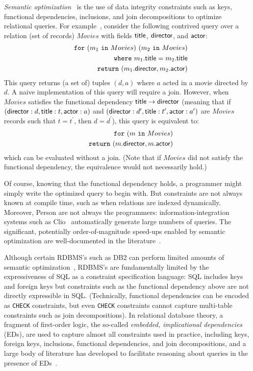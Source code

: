 \documentclass[preprint]{sigplanconf}
\newcommand{\FOR}{{\tt for} \ }
\newcommand{\WHERE}{{\tt where} \ }
\newcommand{\IN}{ \ {\tt in} \ }
\newcommand{\RETURN}{{\tt return} \ }
\begin{document}
{\it Semantic optimization}~\cite{foundations,Deutsch:2006:QRC:1121995.1122010,Popa99anequational} is the 
use of data integrity constraints such as keys, functional dependencies, inclusions, and join decompositions to optimize relational queries. For example~\cite{foundations}, consider the following contrived query over a relation (set of records) $Movies$ 
with fields ${\sf title}$, ${\sf director}$, and ${\sf actor}$:
\begin{eqnarray*}
& & \FOR (m_1 \IN Movies) \ (m_2 \IN Movies) \\
 & & \WHERE m_1.{\sf title} = m_2.{\sf title} \\
 & & \RETURN (m_1.{\sf director}, m_2.{\sf actor})
\end{eqnarray*}        
This query returns (a set of) tuples $(d,a)$ where $a$ acted in a movie directed by $d
$.  A naive implementation of this query will require a join.  However, when $Movies$ 
satisfies the functional dependency ${\sf title} \to {\sf director}$ (meaning that 
if $({\sf director}: d, {\sf title}: t, {\sf actor}: a)$ and $({\sf director}: d^\prime, {\sf title}: t^\prime, {\sf actor}: a^\prime)$ are $Movies$ records such that $t = t^\prime$, then $d = d^\prime$), this query is equivalent to:
\begin{eqnarray*}
& & \FOR (m \IN Movies) \\
 & & \RETURN (m.{\sf director}, m.{\sf actor})
 \end{eqnarray*}
which can be evaluated without a join.  (Note that if $Movies$ did not satisfy the functional dependency, the equivalence would not necessarily hold.)  

Of course, knowing that the functional dependency holds, a programmer might simply write the optimized query to begin with.  But constraints are not always known at compile time, such as when relations are indexed dynamically.  Moreover, Person are not always the programmers: information-integration systems such as Clio~\cite{haas:clio} automatically generate large numbers of queries.  The significant, potentially order-of-magnitude speed-ups enabled by semantic optimization are well-documented in the literature~\cite{Cheng:1999:ITS:645925.671357}.  

Although certain RDBMS's such as DB2 can perform limited amounts of semantic optimization~\cite{Cheng:1999:ITS:645925.671357}, RDBMS's are fundamentally limited by the expressiveness of SQL as a constraint specification language: SQL includes keys and foreign keys but constraints such as the functional dependency above are not directly expressible in SQL.  (Technically, functional dependencies can be encoded as {\tt CHECK} constraints, but even {\tt CHECK} constraints cannot capture multi-table constraints such as join decompositions).  In relational database theory, a fragment of first-order logic, the so-called {\it embedded, implicational dependencies} (EDs), are used to capture almost all constraints used in practice, including keys, foreign keys, inclusions, functional dependencies, and join decompositions, and a large body of literature has developed to facilitate reasoning about queries in the presence of EDs~\cite{Popa99anequational}. 
\end{document}
